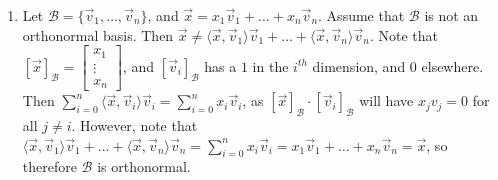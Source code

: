 \documentclass[10pt,english]{article}
\begin{document}
\begin{enumerate}
\pagebreak
\item Let $\mathcal{B}=\{\vec{v}_1,\ldots,\vec{v}_n\}$, and $\vec{x}=x_1\vec{v}_1+\ldots+x_n\vec{v}_n$. Assume that $\mathcal{B}$ is not an orthonormal basis. Then $\vec{x}\neq\langle\vec{x},\vec{v}_1\rangle\vec{v}_1+\ldots+\langle\vec{x},\vec{v}_n\rangle\vec{v}_n$. Note that $[\vec{x}]_\mathcal{B}=\begin{bmatrix}x_1\\\vdots\\x_n\end{bmatrix}$, and $[\vec{v}_i]_\mathcal{B}$ has a $1$ in the $i^{th}$ dimension, and $0$ elsewhere. Then $\sum_{i=0}^n\langle\vec{x},\vec{v}_i\rangle\vec{v}_i=\sum_{i=0}^nx_i\vec{v}_i$, as $[\vec{x}]_\mathcal{B}\cdot[\vec{v}_i]_\mathcal{B}$ will have $x_jv_j=0$ for all $j\neq i$. However, note that $\langle\vec{x},\vec{v}_1\rangle\vec{v}_1+\ldots+\langle\vec{x},\vec{v}_n\rangle\vec{v}_n=\sum_{i=0}^nx_i\vec{v}_i=x_1\vec{v}_1+\ldots+x_n\vec{v}_n=\vec{x}$, so therefore $\mathcal{B}$ is orthonormal. 


\end{enumerate}
\end{document}
